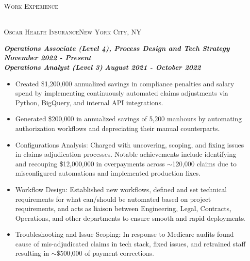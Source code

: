 \documentclass[a4paper]{article}
\newcommand{\lineunder} {
    \vspace*{-8pt} \\
    \hspace*{-18pt} \hrulefill \\
}
\newcommand{\header} [1] {
    {\hspace*{-18pt}\vspace*{6pt} \textsc{#1}}
    \vspace*{-6pt} \lineunder
}
\newcommand{\jobtitle} [1] {
    {\hspace*{-18pt} \textsc{#1}}

}
\begin{document}
\header{Work Experience}
\vspace{1mm}
\jobtitle{Oscar Health Insurance\hfill New York City, NY}
\hspace*{-16pt}\textit{\textbf{Operations Associate (Level 4), Process Design and Tech Strategy}} \hfill \textit{\textbf{November 2022 - Present}}\\
\hspace*{-16pt}\textit{\textbf{Operations Analyst (Level 3)}} \hfill \textit{\textbf{August 2021 - October 2022}}\\
\vspace{-1mm}
\begin{itemize}[leftmargin=10pt,align=left]

    \vspace{-1.5mm} \item
            Created \$1,200,000 annualized savings in compliance penalties and salary spend by implementing continuously automated claims adjustments
            via Python, BigQuery, and internal API integrations.

    \vspace{-1.5mm} \item
            Generated \$200,000 in annualized savings of 5,200 manhours by automating authorization workflows and depreciating their manual counterparts.

    \vspace{-1.5mm} \item
            Configurations Analysis: Charged with uncovering, scoping, and fixing issues in claims adjudication processes.
            Notable achievements include identifying and recouping \$12,000,000 in overpayments across
            $\sim$120,000 claims due to misconfigured automations and implemented production fixes.

    \vspace{-1.5mm} \item
        Workflow Design: Established new workflows, defined and set technical requirements for what can/should be automated based on project requirements,
        and acts as liaison between Engineering, Legal, Contracts, Operations, and other departments to ensure smooth and rapid deployments.

    \vspace{-1.5mm} \item
        Troubleshooting and Issue Scoping: In response to Medicare audits found cause of mis-adjudicated claims in tech stack, fixed issues, and retrained staff
        resulting in $\sim\$$500,000 of payment corrections.


\end{itemize}
\end{document}
